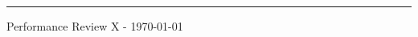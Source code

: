 \documentclass[10pt, a4paper]{article} %
\begin{document}
\textbf{\huge{%
}} 
\vspace{-10pt}
\rule{\columnwidth}{1pt}  %

Performance Review X - \today %

\end{document}
